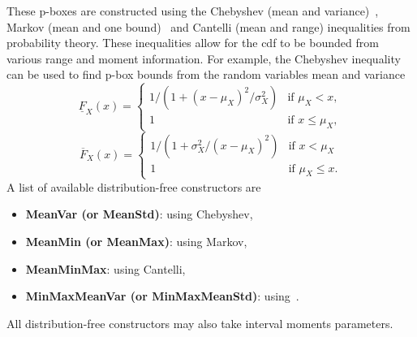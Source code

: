 \documentclass{juliacon}
\begin{document}
These p-boxes are constructed using the Chebyshev (mean and variance)~\cite{chebyshev1874valeurs}, Markov (mean and one bound)~\cite{markoff1900question} and Cantelli (mean and range) inequalities from probability theory. These inequalities allow for the cdf to be bounded from various range and moment information. For example, the Chebyshev inequality can be used to find p-box bounds from the random variables mean and variance
\begin{equation*}
  \underline{F}_{X}(x) = \begin{cases} 1 / (1 + (x - \mu_{X})^2 / \sigma^{2}_{X}) & \text{if } \mu_{X}<x, \\
    1 & \text{if } x\leq \mu_{X}, \end{cases}
\end{equation*}
\begin{equation*}
  \overline{F}_{X}(x)  = \begin{cases} 1 / (1 + \sigma^{2}_{X}/(x - \mu_{X})^2) & \text{if } x<\mu_{X} \\
  1 & \text{if } \mu_{X}\leq x. \end{cases}
\end{equation*}
\noindent A list of available distribution-free constructors are
\begin{itemize}
  \item \textbf{MeanVar (or MeanStd)}: using Chebyshev,
  \item \textbf{MeanMin (or MeanMax)}: using Markov,
  \item \textbf{MeanMinMax}: using Cantelli,
  \item \textbf{MinMaxMeanVar (or MinMaxMeanStd)}: using~\cite{ferson2021distribution}.
\end{itemize}
\noindent All distribution-free constructors may also take interval moments parameters.
\end{document}
